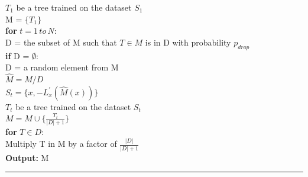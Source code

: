 \documentclass[a4paper]{article}
\begin{document}
\begin{itemize}
					\hspace*{32pt}	$T_1$ be a tree trained on the dataset $S_1$\\
					\hspace*{32pt}	M = $\{T_1\}$\\
					\hspace*{32pt}  \textbf{for} $t = 1\,to\,N$:\\
					\hspace*{48pt}	D = the subset of M such that $T\in M$ is in D with probability $p_{drop}$\\
					\hspace*{48pt}  \textbf{if} D = $\emptyset$:\\
					\hspace*{64pt}	D = a random element from M\\
					\hspace*{48pt}	$\hat{M}  = M \slash D$\\
					\hspace*{48pt}	$S_t = \{x, -L_x^{'}(\hat{M}(x))\}$\\
					\hspace*{48pt}	$T_t$ be a tree trained on the dataset $S_t$\\
					\hspace*{48pt}	$M = M \cup \{\frac{T_t}{|D|+1}\}$\\
					\hspace*{48pt}	\textbf{for} $T\in D$:\\
					\hspace*{64pt}	Multiply T in M by a factor of $\frac{|D|}{|D|+1}$\\
					\textbf{Output:} M\\
			\noindent\rule[0.10\baselineskip]{\textwidth}{0.75pt}
		\end{itemize}
\end{document}
